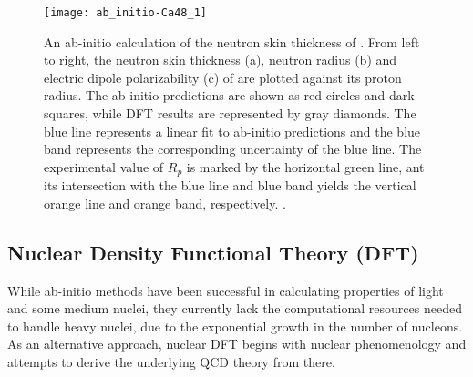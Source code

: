 \begin{figure}[!h]
    \centering
    \texttt{[image: ab\_initio-Ca48\_1]}
    \caption[An ab-initio calculation of the neutron skin thickness of \Ca.]
    {An ab-initio calculation of the neutron skin thickness of \Ca.
    From left to right, the neutron skin thickness (a), neutron radius (b) and
    electric dipole polarizability (c) of \Ca are plotted against its proton 
    radius. The ab-initio predictions are shown as red circles and dark squares,
    while DFT results are represented by gray diamonds. The blue line represents 
    a linear fit to ab-initio predictions and the blue band represents the corresponding
    uncertainty of the blue line. The experimental value of $R_p$ is marked by 
    the horizontal green line, ant its intersection with the blue line and blue band yields
    the vertical orange line and orange band, respectively. \cite{Hagen2016}.}
\end{figure}

\begin{comment}
Deviation of ab-initio result and observation for heavy nuclei indicates the 
importance of higher-order interactions.

\begin{equation}
    \CL_{eff} = \CL_{\pi\pi} + \CL_{\pi N} + \CL_{NN} + \cdots
\end{equation}

three-nucleon forces are hard to observe directly, they increase the pressure of
neutron matter and therefore the neutron skin thickness of both \Pb and \Ca.

three-nucleon force term
\begin{itemize}
    \item Long-range two-pion exchange
    \item Medium-range one-pion exchange
    \item Short range three-nucleon contact
\end{itemize}
\end{comment}
\subsection{Nuclear Density Functional Theory (DFT)}
While ab-initio methods have been successful in calculating properties of light 
and some medium nuclei, they currently lack the computational resources needed to
handle heavy nuclei, due to the exponential growth in the number of nucleons.
As an alternative approach, nuclear DFT begins with nuclear phenomenology and 
attempts to derive the underlying QCD theory from there.

